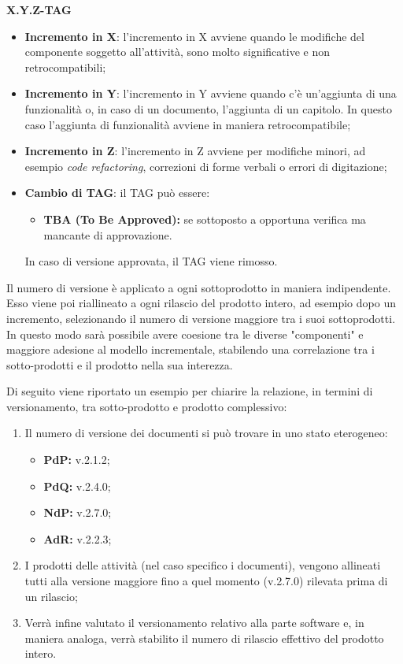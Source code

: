 \centerline{\textbf{X.Y.Z-TAG}}


\begin{itemize}
  \item \textbf{Incremento in X}: l'incremento in X avviene quando le modifiche del componente soggetto all'attività, sono molto significative e non retrocompatibili;
  \item \textbf{Incremento in Y}: l'incremento in Y avviene quando c'è un'aggiunta
  di una funzionalità o, in caso di un documento, l'aggiunta di un capitolo. In questo caso l'aggiunta di funzionalità avviene in maniera retrocompatibile;
  \item \textbf{Incremento in Z}: l'incremento in Z avviene per modifiche minori,
  ad esempio \textit{code refactoring\glos}, correzioni di forme verbali o errori di digitazione;
  \item \textbf{Cambio di TAG}: il TAG può essere:
  \begin{itemize}
  	\item \textbf{TBA (To Be Approved):} se sottoposto a opportuna verifica ma mancante di approvazione.
  \end{itemize}
  In caso di versione approvata, il TAG viene rimosso.
\end{itemize}
 \noindent Il numero di versione è applicato a ogni sottoprodotto in maniera indipendente.
 Esso viene poi riallineato a ogni rilascio del prodotto intero, ad esempio dopo un incremento, selezionando il numero di versione maggiore tra i suoi sottoprodotti.
 In questo modo sarà possibile avere coesione tra le diverse "componenti" e maggiore adesione al modello incrementale, stabilendo una correlazione tra i sotto-prodotti e il prodotto nella sua interezza.


\noindent Di seguito viene riportato un esempio per chiarire la relazione, in termini di versionamento, tra sotto-prodotto e prodotto complessivo:
\begin{enumerate}
	\item Il numero di versione dei documenti si può trovare in uno stato eterogeneo:
	\begin{itemize}
		\item \textbf{PdP:} v.2.1.2;
		\item \textbf{PdQ:} v.2.4.0;
		\item \textbf{NdP:} v.2.7.0;
		\item\textbf{AdR:} v.2.2.3;
	\end{itemize}
	\item I prodotti delle attività (nel caso specifico i documenti), vengono allineati tutti alla versione maggiore fino a quel momento (v.2.7.0) rilevata prima di un rilascio;
	\item Verrà infine valutato il versionamento relativo alla parte software e, in maniera analoga, verrà stabilito il numero di rilascio effettivo del prodotto intero.
\end{enumerate}

